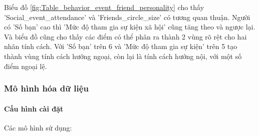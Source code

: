     Biểu đồ \ref{fig:Table_behavior_event_friend_personality} cho thấy 'Social\_event\_attendance' và 'Friends\_circle\_size' có tương quan thuận. Người có 'Số bạn' cao thì 'Mức độ tham gia sự kiện xã hội' cũng tăng theo và ngược lại. Và biểu đồ cũng cho thấy các điểm có thể phân ra thành 2 vùng rõ rệt cho hai nhãn tính cách. Với 'Số bạn' trên 6 và 'Mức độ tham gia sự kiện' trên 5 tạo thành vùng tính cách hướng ngoại, còn lại là tính cách hướng nội, với một số điểm ngoại lệ.

\subsubsection{Mô hình hóa dữ liệu}
    \paragraph{Cấu hình cài đặt} 
    \leavevmode

    Các mô hình sử dụng:

